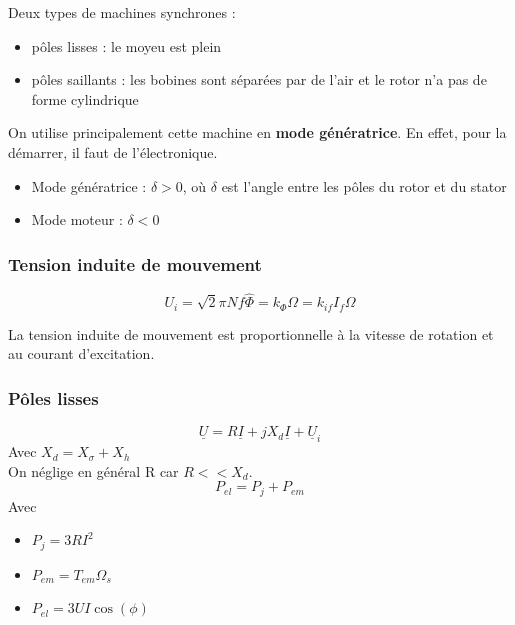 \documentclass[../main.tex]{subfiles}
\begin{document}
Deux types de machines synchrones : \begin{itemize}
    \item pôles lisses : le moyeu est plein\\
    \item pôles saillants : les bobines sont séparées par de l'air et le rotor n'a pas de forme cylindrique\\
\end{itemize}

On utilise principalement cette machine en \textbf{mode génératrice}. En effet, pour la démarrer, il faut de l'électronique.\\

\begin{itemize}
    \item Mode génératrice : $\delta>0$, où $\delta$ est l'angle entre les pôles du rotor et du stator\\
    \item Mode moteur : $\delta<0$\\
\end{itemize}

\subsubsection{Tension induite de mouvement}
\begin{equation}
    U_i = \sqrt{2} \pi N f \hat{\Phi} = k_\Phi \Omega = k_{if}I_f \Omega
\end{equation}

La tension induite de mouvement est proportionnelle à la vitesse de rotation et au courant d'excitation.\\

\subsubsection{Pôles lisses}
\begin{equation}
    \underline{U} = R\underline{I} + j X_d \underline{I}+ \underline{U}_i
\end{equation}
Avec $X_d = X_\sigma + X_h$\\
On néglige en général R car $R<<X_d$.\\

\begin{equation}
    P_{el} = P_j + P_{em}
\end{equation}
Avec \begin{itemize}
    \item $P_j = 3RI^2$\\
    \item $P_{em} = T_{em}\Omega_s$\\
    \item $P_{el} = 3UI\cos(\phi)$\\
\end{itemize}
\end{document}
